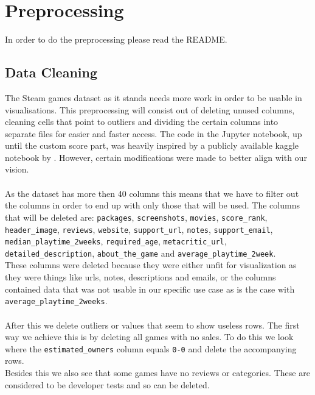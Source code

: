 \documentclass{article}
\begin{document}
	\newpage
	
	\section{Preprocessing}
	
	In order to do the preprocessing please read the README.
	
	\subsection{Data Cleaning}
	
	The Steam games dataset as it stands needs more work in order to be usable in visualisations. This preprocessing will consist out of deleting unused columns, cleaning cells that point to outliers and dividing the certain columns into separate files for easier and faster access. The code in the Jupyter notebook, up until the custom score part, was heavily inspired by a publicly available kaggle notebook by \autocite{CLARAMUNT}. However, certain modifications were made to better align with our vision.\\
	\\
	As the dataset has more then 40 columns this means that we have to filter out the columns in order to end up with only those that will be used. The columns that will be deleted are: \texttt{packages}, \texttt{screenshots}, \texttt{movies}, \texttt{score\_rank}, \texttt{header\_image}, \texttt{reviews}, \texttt{website}, \texttt{support\_url}, \texttt{notes}, \texttt{support\_email}, \texttt{median\_playtime\_2weeks}, \texttt{required\_age}, \texttt{metacritic\_url}, \texttt{detailed\_description}, \texttt{about\_the\_game} and \texttt{average\_playtime\_2week}.\\
	These columns were deleted because they were either unfit for visualization as they were things like urls, notes, descriptions and emails, or the columns contained data that was not usable in our specific use case as is the case with \texttt{average\_playtime\_2weeks}.\\
	\\
	After this we delete outliers or values that seem to show useless rows. The first way we achieve this is by deleting all games with no sales. To do this we look where the \texttt{estimated\_owners} column equals \texttt{0-0} and delete the accompanying rows.\\
	Besides this we also see that some games have no reviews or categories. These are considered to be developer tests and so can be deleted.\\
\end{document}
